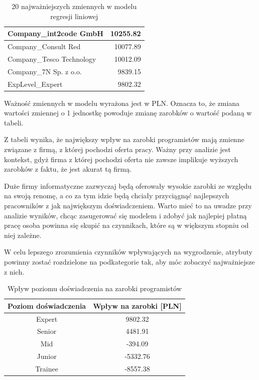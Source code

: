 \documentclass{article}
\begin{document}
\begin{table}[H]
\begin{tabular}{|l|r|}
        Company\_int2code GmbH                     & 10255.82           \\ \hline
        Company\_Consult Red                       & 10077.89           \\ \hline
        Company\_Tesco Technology                  & 10012.09           \\ \hline
        Company\_7N Sp. z o.o.                     & 9839.15            \\ \hline
        ExpLevel\_Expert                           & 9802.32            \\ \hline
    \end{tabular}
    \caption{20 najważniejszych zmiennych w modelu regresji liniowej}
    \label{tab:importance}
\end{table}

Ważność zmiennych w modelu wyrażona jest w PLN.
Oznacza to, że zmiana wartości zmiennej o 1 jednostkę powoduje zmianę
zarobków o wartość podaną w tabeli.

Z tabeli wynika, że największy wpływ na zarobki programistów mają zmienne związane z firmą,
z której pochodzi oferta pracy. Ważny przy analizie jest kontekst, gdyż firma z której
pochodzi oferta nie zawsze implikuje wyższych zarobków z faktu, że jest akurat tą firmą.


Duże firmy informatyczne zazwyczaj będą oferowały wysokie zarobki ze względu na swoją renomę,
a co za tym idzie będą chciały przyciągnąć najlepszych pracowników z jak największym doświadczeniem.
Warto mieć to na uwadze przy analizie wyników, chcąc zasugerować się modelem
i zdobyć jak najlepiej płatną pracę osoba powinna się skupić na czynnikach, które są
w większym stopniu od niej zależne.

\bigskip

W celu lepszego zrozumienia czynników wpływających na wygrodzenie, atrybuty powinny zostać
rozdzielone na podkategorie tak, aby móc zobaczyć najważniejsze z nich.

\begin{table}[H]
    \centering
    \begin{tabular}{|c|c|}
        \hline
        \textbf{Poziom doświadczenia} & \textbf{Wpływ na zarobki [PLN]} \\ \hline
        Expert                        & 9802.32                         \\ \hline
        Senior                        & 4481.91                         \\ \hline
        Mid                           & -394.09                         \\ \hline
        Junior                        & -5332.76                        \\ \hline
        Trainee                       & -8557.38                        \\ \hline
    \end{tabular}
    \caption{Wpływ poziomu doświadczenia na zarobki programistów}
    \label{tab:experience}
\end{table}
\end{document}
